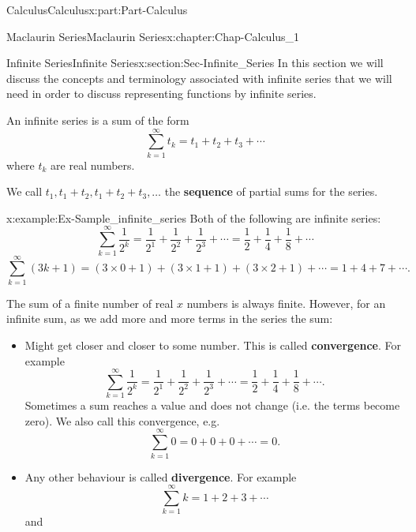 \documentclass[oneside,10pt,]{book}
\newcommand{\terminology}[1]{\textbf{#1}}
\numberwithin{equation}{section}
\begin{document}
\begin{partptx}{Calculus}{}{Calculus}{}{}{x:part:Part-Calculus}
\begin{chapterptx}{Maclaurin Series}{}{Maclaurin Series}{}{}{x:chapter:Chap-Calculus_1}
%
\begin{sectionptx}{Infinite Series}{}{Infinite Series}{}{}{x:section:Sec-Infinite_Series}
In this section we will discuss the concepts and terminology associated with infinite series that we will need in order to discuss representing functions by infinite series.%
\par
An infinite series is a sum of the form%
\begin{equation*}
\sum_{k=1}^{\infty}t_k = t_1 + t_2 +t_3 + \cdots
\end{equation*}
where \(t_k\) are real numbers.%
\par
We call \(t_1, t_1+t_2, t_1+t_2+t_3, \ldots\) the \terminology{sequence} of partial sums for the series.%
\begin{example}{}{x:example:Ex-Sample_infinite_series}%
Both of the following are infinite series:%
\begin{equation*}
\sum_{k=1}^{\infty}\frac{1}{2^k} = \frac{1}{2^1}+\frac{1}{2^2}+\frac{1}{2^3} + \cdots = \frac{1}{2} + \frac{1}{4} + \frac{1}{8} + \cdots 
\end{equation*}
%
\begin{equation*}
\sum_{k=1}^{\infty}(3k+1) = (3\times 0+1)+(3\times 1+1)+(3\times 2+1) + \cdots = 1 + 4 +7 + \cdots.
\end{equation*}
%
\end{example}
The sum of a finite number of real \(x\) numbers is always finite. However, for an infinite sum, as we add more and more terms in the series the sum:%
\begin{itemize}[label=\textbullet]
\item{}Might get closer and closer to some number. This is called \terminology{convergence}. For example%
\begin{equation*}
\sum_{k=1}^{\infty}\frac{1}{2^k}=\frac{1}{2^1}+\frac{1}{2^2}+\frac{1}{2^3}+\cdots = \frac{1}{2}+\frac{1}{4}+\frac{1}{8}+\cdots.
\end{equation*}
Sometimes a sum reaches a value and does not change (i.e. the terms become zero). We also call this convergence, e.g.%
\begin{equation*}
\sum_{k=1}^{\infty}0 = 0+0+0+\cdots = 0.
\end{equation*}
%
\item{}Any other behaviour is called \terminology{divergence}. For example%
\begin{equation*}
\sum_{k=1}^{\infty}k = 1+2+3+\cdots
\end{equation*}
and%
\begin{equation*}

\end{equation*}
\end{itemize}
\end{sectionptx}
\end{chapterptx}
\end{partptx}
\end{document}
